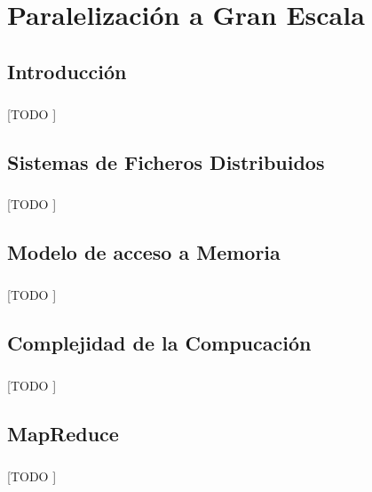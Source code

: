 \documentclass{subfiles}
\begin{document}
  \chapter{Paralelización a Gran Escala}
  \label{chap:parallel}

    \section{Introducción}
    \label{sec:parallel_intro}

      \paragraph{}
      [TODO ]

    \section{Sistemas de Ficheros Distribuidos}
    \label{sec:distributed_file_systems}

      \paragraph{}
      [TODO ]

    \section{Modelo de acceso a Memoria}
    \label{sec:memory_model}

      \paragraph{}
      [TODO ]

    \section{Complejidad de la Compucación}
    \label{sec:communication_complexity}

      \paragraph{}
      [TODO ]


    \section{MapReduce}
    \label{sec:map_reduce}

      \paragraph{}
      [TODO ]
\end{document}
